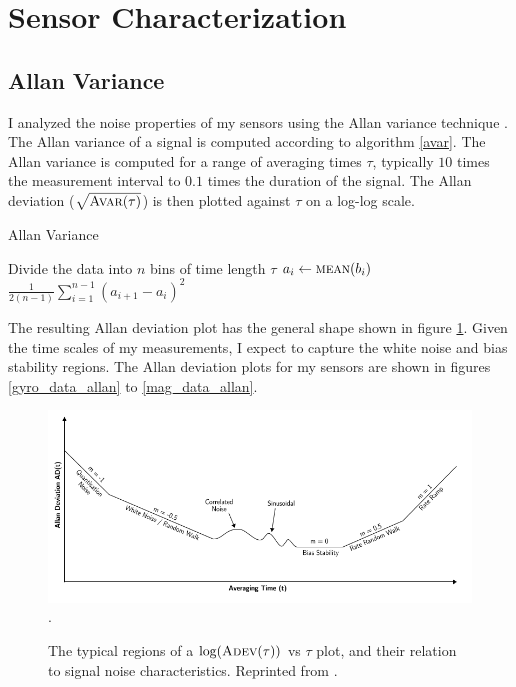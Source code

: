 \documentclass[conference]{IEEEtran}
\begin{document}
\section{Sensor Characterization}
\label{sensor_char}
\subsection{Allan Variance}
I analyzed the noise properties of my sensors using the Allan variance technique \cite{UCAM-CL-TR-696}. The Allan variance of a signal is computed  according to algorithm \ref{avar}. The Allan variance is computed for a range of averaging times $\tau$, typically $10$ times the measurement interval to $0.1$ times the duration of the signal. The Allan deviation ($\sqrt{\textproc{Avar}(\tau)}$) is then plotted against $\tau$ on a log-log scale.\\

\begin{algorithm}
  \caption{Allan Variance}
  \label{avar}
  \begin{algorithmic}
      \State Divide the data into $n$ bins of time length $\tau$
        \State $a_i \gets \Call{mean}{b_i}$
      \EndFor
      \State \Return $\frac{1}{2 (n-1)} \sum_{i=1}^{n-1} (a_{i+1} - a_{i})^2$
      \EndFunction
  \end{algorithmic}
\end{algorithm}

The resulting Allan deviation plot has the general shape shown in figure \ref{allan_regions}. Given the time scales of my measurements, I expect to capture the white noise and bias stability regions. The Allan deviation plots for my sensors are shown in figures \ref{gyro_data_allan} to \ref{mag_data_allan}. \\

\begin{figure}[!t]
  \centering
  \includegraphics[width=7.5in]{figures/allan_regions.png}
  \DeclareGraphicsExtensions.
  \caption{The typical regions of a $\log(\textproc{Adev}(\tau))$ vs $\tau$ plot, and their relation to signal noise characteristics. Reprinted from \cite{UCAM-CL-TR-696}.}
  \label{allan_regions}
\end{figure}
\end{document}
